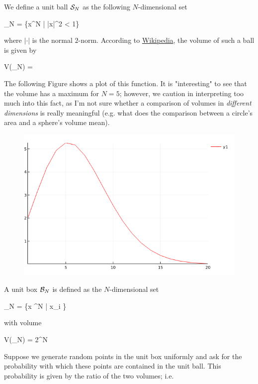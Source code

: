 
We define a unit ball $\mathcal{S}_N$ as the following $N$-dimensional set

\bee
\Sc_N = \{x\in \mR^N | |x|^2 < 1\}
\eee

where $|\cdot|$ is the normal $2$-norm. According to \href{https://en.wikipedia.org/wiki/Volume_of_an_n-ball}{Wikipedia}, the volume of such a ball is given by


\bee
V(\Sc_N) = 
\eee

The following Figure shows a plot of this function. It is "interesting" to see that the volume has a maximum for $N=5$; however, we caution in interpreting too much into this fact, as I'm not sure whether a comparison of volumes in \emph{different dimensions} is really meaningful (e.g. what does the comparison between a circle's area and a sphere's volume mean).


\begin{figure}[H]
	\includegraphics[scale=0.7]{images/high_dim_02_02.png}
\end{figure}


A unit box $\mathcal{B}_N$ is defined as the $N$-dimensional set

\bee
\Bc_N = \{x \in \mR^N | x_i \in [-1,1]\}
\eee

with volume

\bee
V(\Bc_N) = 2^N
\eee

Suppose we generate random points in the unit box uniformly and ask for the probability with which these points are contained in the unit ball. This probability is given by the ratio of the two volumes; i.e.

